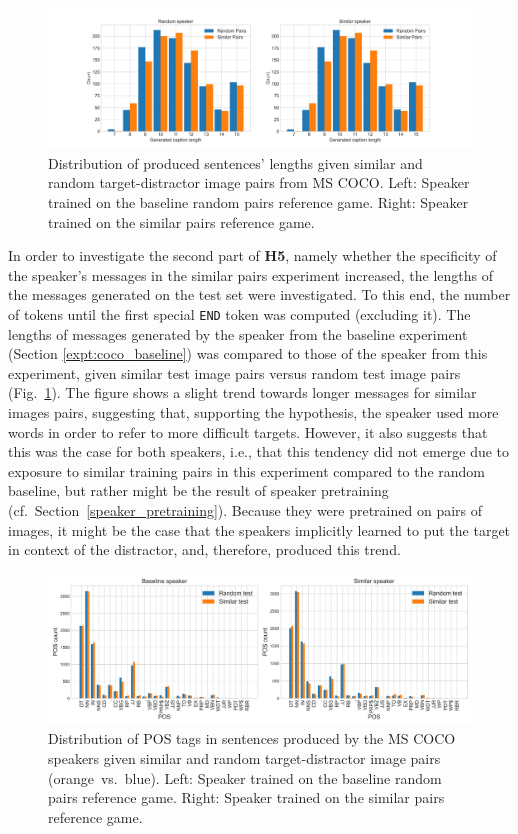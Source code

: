 \begin{figure}[h]
	\centering
	\includegraphics[width=\linewidth]{images/coco_random_similar_length_counts.png}
	\caption{Distribution of produced sentences' lengths given similar and random target-distractor image pairs from MS COCO. Left: Speaker trained on the baseline random pairs reference game. Right: Speaker trained on the similar pairs reference game.}
	\label{fig:coco_similar_random_speaker_lengths}
\end{figure}
In order to investigate the second part of \textbf{H5}, namely whether the specificity of the speaker's messages in the similar pairs experiment increased, the lengths of the messages generated on the test set were investigated. To this end, the number of tokens until the first special \texttt{END} token was computed (excluding it). The lengths of messages generated by the speaker from the baseline experiment (Section \ref{expt:coco_baseline}) was compared to those of the speaker from this experiment, given similar test image pairs versus random test image pairs (Fig.~\ref{fig:coco_similar_random_speaker_lengths}). The figure shows a slight trend towards longer messages for similar images pairs, suggesting that, supporting the hypothesis, the speaker used more words in order to refer to more difficult targets. However, it also suggests that this was the case for both speakers, i.e., that this tendency did not emerge due to exposure to similar training pairs in this experiment compared to the random baseline, but rather might be the result of speaker pretraining (cf.~Section~\ref{speaker_pretraining}). Because they were pretrained on pairs of images, it might be the case that the speakers implicitly learned to put the target in context of the distractor, and, therefore, produced this trend.
\begin{figure}[h]
	\centering
	\includegraphics[width=\linewidth]{images/coco_similar_v_baseline_randomTest_vs_similarTest_POS_counts.png}
	\caption{Distribution of POS tags in sentences produced by the MS COCO speakers given similar and random target-distractor image pairs (orange~vs.~blue). Left: Speaker trained on the baseline random pairs reference game. Right: Speaker trained on the similar pairs reference game.}
	\label{fig:coco_similar_random_speaker_POS}
\end{figure}
